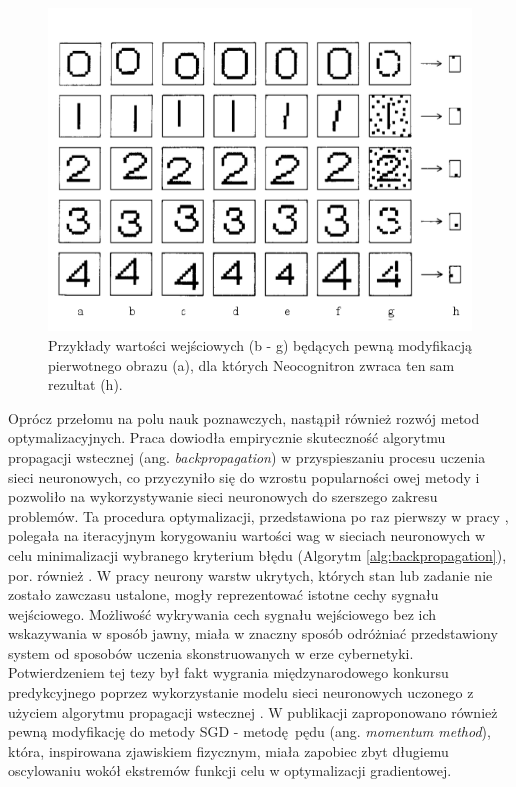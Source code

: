 \documentclass[12pt,a4paper,twoside]{article}
\begin{document}
\begin{figure}[h]
  \centering
\includegraphics[scale=0.5]{../obrazy/fig:distortion.png}
\caption{Przykłady wartości wejściowych (b - g) będących pewną modyfikacją pierwotnego obrazu (a), dla których Neocognitron zwraca ten sam rezultat (h). \label{fig:distortion}}
\end{figure}

Oprócz przełomu na polu nauk poznawczych, nastąpił również rozwój metod optymalizacyjnych. Praca \citet{rumelhart1986} dowiodła empirycznie skuteczność algorytmu propagacji wstecznej (ang. \textit{backpropagation}) w przyspieszaniu procesu uczenia sieci neuronowych, co przyczyniło się do wzrostu popularności owej metody i pozwoliło na wykorzystywanie sieci neuronowych do szerszego zakresu problemów. Ta procedura optymalizacji, przedstawiona po raz pierwszy w pracy \citet{linnainmaa1970}, polegała na iteracyjnym korygowaniu wartości wag w sieciach neuronowych w celu minimalizacji wybranego kryterium błędu (Algorytm \ref{alg:backpropagation}), por. również \citet{hecht1988}. W pracy \citet{rumelhart1986} neurony warstw ukrytych, których stan lub zadanie nie zostało zawczasu ustalone, mogły reprezentować istotne cechy sygnału wejściowego. Możliwość wykrywania cech sygnału wejściowego bez ich wskazywania w sposób jawny, miała w znaczny sposób odróżniać przedstawiony system od sposobów uczenia skonstruowanych w erze cybernetyki. Potwierdzeniem tej tezy był fakt wygrania międzynarodowego konkursu predykcyjnego poprzez wykorzystanie modelu sieci neuronowych uczonego z użyciem algorytmu propagacji wstecznej \citep{wan1993}. W publikacji \citet{rumelhart1986} zaproponowano również pewną modyfikację do metody SGD - metodę pędu (ang. \textit{momentum method}), która, inspirowana zjawiskiem fizycznym, miała zapobiec zbyt długiemu oscylowaniu wokół ekstremów funkcji celu w optymalizacji gradientowej.
\end{document}

